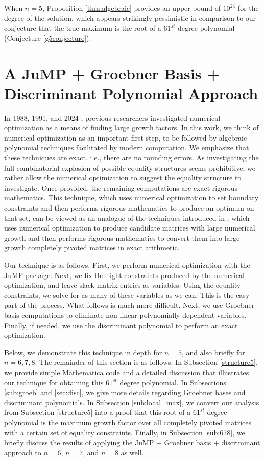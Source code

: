 \documentclass[reqno]{amsart}
\numberwithin{equation}{section}
\begin{document}
When $n = 5$, Proposition \ref{thm:algebraic} provides an upper bound of $10^{24}$ for the degree of the solution, which appears strikingly pessimistic in comparison to our conjecture that the true maximum is the root of a $61^{st}$ degree polynomial (Conjecture \ref{g5conjecture}).


\section{A JuMP + Groebner Basis + Discriminant Polynomial Approach}\label{sec:jump}

In 1988, 1991, and 2024 \cite{day1988growth,gould1991growth,edelman2024some}, previous researchers investigated
numerical optimization as a means of finding large
growth factors.  In this work, we think of numerical
optimization as an important first step, to be followed by
algebraic polynomial techniques facilitated by
modern computation.  We emphasize that these
techniques are exact, i.e., there are no rounding
errors.  As investigating the full combinatorial explosion
of possible equality structures seems prohibitive,
we rather allow the
numerical optimization to suggest the  equality structure to investigate.
Once provided, the remaining computations are exact rigorous
mathematics. This technique, which uses numerical optimization to set boundary constraints and then performs rigorous mathematics to produce an optimum on that set, can be viewed as an analogue of the techniques introduced in \cite{edelman2024some}, which uses numerical optimization to produce candidate matrices with large numerical growth and then performs rigorous mathematics to convert them into large growth completely pivoted matrices in exact arithmetic.

Our technique is as follows. First, we perform numerical optimization with the JuMP package. Next, we fix the tight constraints produced by the numerical optimization, and leave slack matrix entries as variables. Using the equality constraints, we solve for as many of these variables as we can. This is the easy part of the process. What follows is much more difficult. Next, we use Groebner basis computations to eliminate
non-linear polynomially dependent variables. Finally, if needed, 
we use the discriminant polynomial to perform an exact optimization.

Below, we demonstrate this technique in depth for $n = 5$, and also briefly for $n = 6,7,8$. The remainder of this section is as follows. In Subsection \ref{structure5}, we provide simple Mathematica code and a detailed discussion that illustrates our technique for obtaining this $61^{st}$ degree polynomial. In Subsections \ref{sub:groeb} and \ref{sec:disc}, we give more details regarding Groebner bases and discriminant polynomials. In Subsection \ref{sub:local_max}, we convert our analysis from Subsection \ref{structure5} into a proof that this root of a $61^{st}$ degree polynomial is the maximum growth factor over all completely pivoted matrices with a certain set of equality constraints. Finally, in Subsection \ref{sub:678}, we briefly discuss the results of applying the JuMP + Groebner basis + discriminant approach to $n = 6$, $n = 7$, and $n = 8$ as well.
\end{document}
